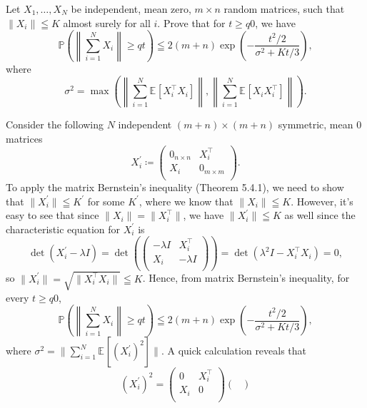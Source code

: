 \begin{problem*}[Exercise 5.4.15]\label{ex5.4.15}
	Let \(X_1, \dots , X_N\) be independent, mean zero, \(m \times n\) random matrices, such that \(\lVert X_i \rVert \leqq K\) almost surely for all \(i\). Prove that for \(t \geq q 0\), we have
	\[
		\mathbb{P} \left( \left\lVert \sum_{i=1}^{N} X_i \right\rVert \geq q t \right)
		\leqq 2 (m+n) \exp (- \frac{t^2 / 2}{\sigma ^2 + Kt / 3}),
	\]
	where
	\[
		\sigma ^2
		= \max \left( \left\lVert \sum_{i=1}^{N} \mathbb{E}_{}[X_i ^{\top} X_i] \right\rVert , \left\lVert \sum_{i=1}^{N} \mathbb{E}_{}[X_i X_i ^{\top} ] \right\rVert \right) .
	\]
\end{problem*}
\begin{answer}
	Consider the following \(N\) independent \((m+n) \times (m+n)\) symmetric, mean \(0\) matrices
	\[
		X_i^{\prime} \coloneqq \begin{pmatrix}
			0_{n\times n} & X_i ^{\top}    \\
			X_i           & 0_{m \times m} \\
		\end{pmatrix}.
	\]
	To apply the matrix Bernstein's inequality (Theorem 5.4.1), we need to show that \(\lVert X_i ^{\prime} \rVert \leqq K^{\prime} \) for some \(K^{\prime} \), where we know that \(\lVert X_i \rVert \leqq K\). However, it's easy to see that since \(\lVert X_i \rVert = \lVert X_i ^{\top} \rVert \), we have \(\lVert X_i^{\prime} \rVert \leqq K\) as well since the characteristic equation for \(X_i ^{\prime} \) is
	\[
		\det (X_i^{\prime} - \lambda I)
		= \det (\begin{pmatrix}
				-\lambda I & X_i ^{\top} \\
				X_i        & -\lambda I  \\
			\end{pmatrix} )
		= \det (\lambda ^2 I - X_i ^{\top} X_i)
		= 0,
	\]
	so \(\lVert X_i^{\prime} \rVert = \sqrt{\lVert X_i ^{\top} X_i \rVert } \leqq K\). Hence, from matrix Bernstein's inequality, for every \(t \geq q 0\),
	\[
		\mathbb{P} \left( \left\lVert \sum_{i=1}^{N} X_i \right\rVert \geq q t \right)
		\leqq 2 (m+n) \exp (- \frac{t^2 / 2}{\sigma ^2 + Kt / 3}),
	\]
	where \(\sigma ^2 = \lVert \sum_{i=1}^{N} \mathbb{E}_{}[(X_i ^{\prime}) ^2] \rVert \). A quick calculation reveals that
	\[
		(X_i^{\prime} )^2
		= \begin{pmatrix}
			0   & X_i ^{\top} \\
			X_i & 0           \\
		\end{pmatrix}\begin{pmatrix}

\end{pmatrix}\]
\end{answer}
